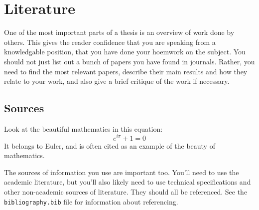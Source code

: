 \chapter{Literature}
\label{section:literature}

One of the most important parts of a thesis is an overview of work done by
others.
This gives the reader confidence that you are speaking from a knowledgable
position, that you have done your hoemwork on the subject.
You should not just list out a bunch of papers you have found in journals.
Rather, you need to find the most relevant papers, describe their main results
and how they relate to your work, and also give a brief critique of the work if
necessary.


\section{Sources}

Look at the beautiful mathematics in this equation:
\begin{equation}
  \label{eq:euler}
  e^{i\pi} + 1 = 0
\end{equation}
It belongs to Euler, and is often cited as an example of the beauty of mathematics.

The sources of information you use are important too.
You'll need to use the academic literature, but you'll also likely need to use
technical specifications and other non-academic sources of literature.
They should all be referenced.
See the \texttt{bibliography.bib} file for information about referencing.

\lipsum[16-25]


